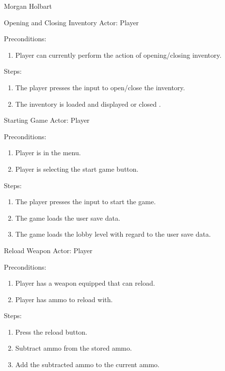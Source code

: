 \documentclass[12pt]{report}
\begin{document}
\begin{section}{Morgan Holbart}
\begin{subsection}{Opening and Closing Inventory}
Actor: Player

Preconditions: 
\begin{enumerate}
\item Player can currently perform the action of opening/closing inventory.
\end{enumerate}

Steps:
\begin{enumerate}
\item The player presses the input to open/close the inventory.
\item The inventory is loaded and displayed or closed .
\end{enumerate}
\end{subsection}

\begin{subsection}{Starting Game}
Actor: Player

Preconditions: 
\begin{enumerate}
\item Player is in the menu.
\item Player is selecting the start game button.
\end{enumerate}

Steps:
\begin{enumerate}
\item The player presses the input to start the game.
\item The game loads the user save data.
\item The game loads the lobby level with regard to the user save data.
\end{enumerate}
\end{subsection}

\begin{subsection}{Reload Weapon}
Actor: Player

Preconditions: 
\begin{enumerate}
\item Player has a weapon equipped that can reload.
\item Player has ammo to reload with.
\end{enumerate}

Steps:
\begin{enumerate}
\item Press the reload button.
\item Subtract ammo from the stored ammo.
\item Add the subtracted ammo to the current ammo.
\end{enumerate}
\end{subsection}


\end{section}
\end{document}

